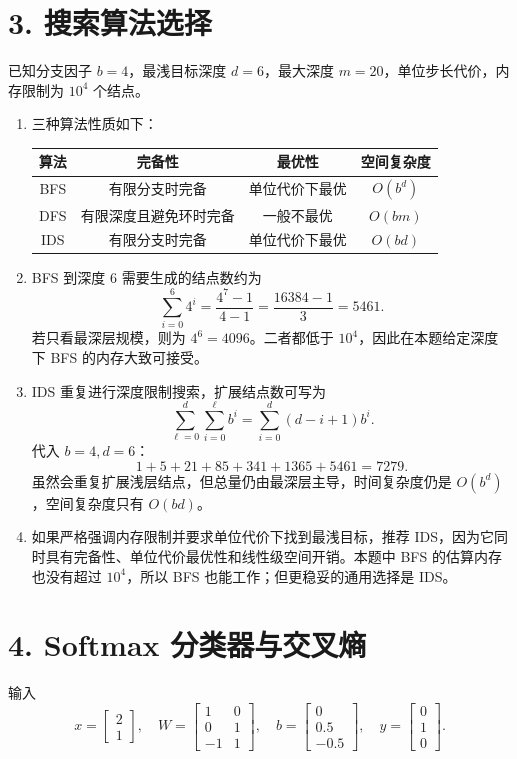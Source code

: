 \documentclass[UTF8,zihao=-4]{ctexart}
\begin{document}
\section*{3. 搜索算法选择}

已知分支因子 $b=4$，最浅目标深度 $d=6$，最大深度 $m=20$，单位步长代价，内存限制为 $10^4$ 个结点。

\begin{enumerate}[label=(\arabic*)]
\item 三种算法性质如下：

\begin{center}
\begin{tabular}{c c c c}
\toprule
算法 & 完备性 & 最优性 & 空间复杂度 \\
\midrule
BFS & 有限分支时完备 & 单位代价下最优 & $O(b^d)$ \\
DFS & 有限深度且避免环时完备 & 一般不最优 & $O(bm)$ \\
IDS & 有限分支时完备 & 单位代价下最优 & $O(bd)$ \\
\bottomrule
\end{tabular}
\end{center}

\item BFS 到深度 $6$ 需要生成的结点数约为
\[
\sum_{i=0}^{6}4^i=\frac{4^7-1}{4-1}=\frac{16384-1}{3}=5461.
\]
若只看最深层规模，则为 $4^6=4096$。二者都低于 $10^4$，因此在本题给定深度下 BFS 的内存大致可接受。

\item IDS 重复进行深度限制搜索，扩展结点数可写为
\[
\sum_{\ell=0}^{d}\sum_{i=0}^{\ell} b^i
=\sum_{i=0}^{d}(d-i+1)b^i.
\]
代入 $b=4,d=6$：
\[
1+5+21+85+341+1365+5461=7279.
\]
虽然会重复扩展浅层结点，但总量仍由最深层主导，时间复杂度仍是 $O(b^d)$，空间复杂度只有 $O(bd)$。

\item 如果严格强调内存限制并要求单位代价下找到最浅目标，推荐 IDS，因为它同时具有完备性、单位代价最优性和线性级空间开销。本题中 BFS 的估算内存也没有超过 $10^4$，所以 BFS 也能工作；但更稳妥的通用选择是 IDS。
\end{enumerate}

\section*{4. Softmax 分类器与交叉熵}

输入
\[
x=\begin{bmatrix}2\\1\end{bmatrix},\quad
W=\begin{bmatrix}1&0\\0&1\\-1&1\end{bmatrix},\quad
b=\begin{bmatrix}0\\0.5\\-0.5\end{bmatrix},\quad
y=\begin{bmatrix}0\\1\\0\end{bmatrix}.
\]
\end{document}
